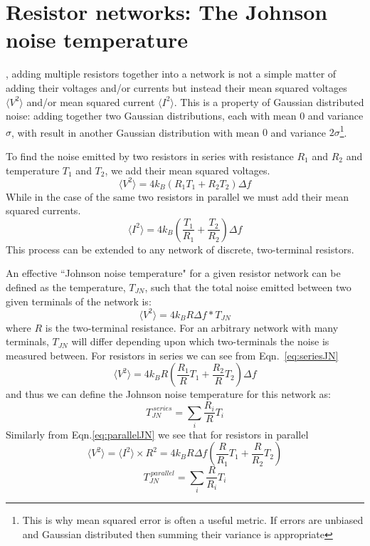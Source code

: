 \section{Resistor networks: The Johnson noise temperature}
\label{section:TJN}
, adding multiple resistors together into a network is not a simple matter of adding their voltages and/or currents but instead their mean squared voltages $\langle V^2\rangle$ and/or mean squared current $\langle I^2\rangle$. This is a property of Gaussian distributed noise: adding together two Gaussian distributions, each with mean $0$ and variance $\sigma$, with result in another Gaussian distribution with mean $0$ and variance $2\sigma$\footnote{This is why mean squared error is often a useful metric. If errors are unbiased and Gaussian distributed then summing their variance is appropriate}.

To find the noise emitted by two resistors in series with resistance $R_1$ and $R_2$ and temperature $T_1$ and $T_2$, we add their mean squared voltages.
\begin{equation} \label{eq:seriesJN}
\langle V^2\rangle = 4k_B (R_1T_1+R_2T_2)\Delta f
\end{equation}
While in the case of the same two resistors in parallel we must add their mean squared currents.
\begin{equation} \label{eq:parallelJN}
\langle I^2\rangle = 4k_B \left(\frac{T_1}{R_1}+\frac{T_2}{R_2}\right)\Delta f
\end{equation}
This process can be extended to any network of discrete, two-terminal resistors.

An effective ``Johnson noise temperature" for a given resistor network can be defined as the temperature, $T_{JN}$, such that the total noise emitted between two given terminals of the network is:
\begin{equation}
\langle V^2\rangle = 4k_BR\Delta f * T_{JN}
\end{equation}
where $R$ is the two-terminal resistance. For an arbitrary network with many terminals, $T_{JN}$ will differ depending upon which two-terminals the noise is measured between. For resistors in series we can see from Eqn.~\ref{eq:seriesJN}
\begin{equation}
\langle V^2\rangle = 4k_BR \left(\frac{R_1}{R}T_1+\frac{R_2}{R}T_2\right)\Delta f
\end{equation}
and thus we can define the Johnson noise temperature for this network as:
\begin{equation}
T_{JN}^{\ series} = \sum_i \frac{R_i}{R}T_i
\end{equation}
Similarly from Eqn.\ref{eq:parallelJN} we see that for resistors in parallel
\begin{equation}
\langle V^2\rangle = \langle I^2\rangle\times R^2 = 4k_BR\Delta f (\frac{R}{R_1}T_1+\frac{R}{R_2}T_2)
\end{equation}
\begin{equation}
T_{JN}^{\ parallel} = \sum_i \frac{R}{R_i}T_i
\end{equation}

